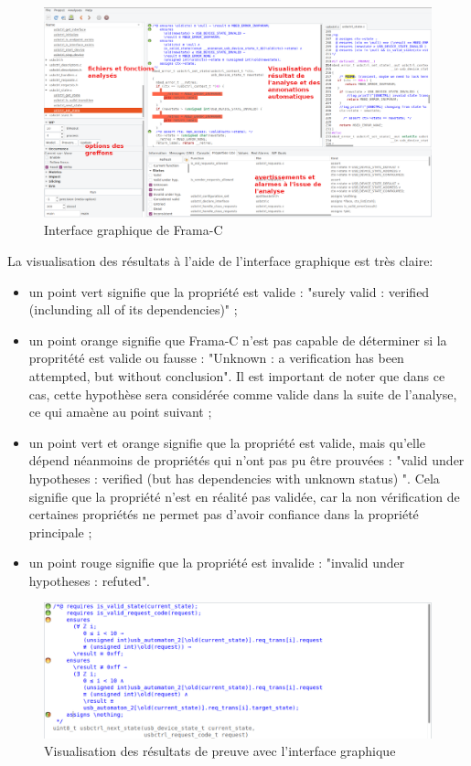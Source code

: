 \begin{figure}[!h]
\centering
\includegraphics[width=18cm]{images/interface_commentee_gimp.png}
\caption{Interface graphique de Frama-C}
\label{Interface graphique de Frama-C}
\end{figure}
\newpage
La visualisation des résultats à l'aide de l'interface graphique est très claire:
\begin{itemize}
	\item un point vert signifie que la propriété est valide : "surely valid : verified (inclunding all of its dependencies)" ;
	\item un point orange signifie que Frama-C n'est pas capable de déterminer si la propritété est valide ou fausse : "Unknown : a verification has been attempted, but without conclusion". Il est important de noter que dans ce cas, cette hypothèse sera considérée comme valide dans la suite de l'analyse, ce qui amaène au point suivant ;
	\item un point vert et orange signifie que la propriété est valide, mais qu'elle dépend néanmoins de propriétés qui n'ont pas pu être prouvées : "valid under hypotheses : verified (but has dependencies with unknown status) ". Cela signifie que la propriété n'est en réalité pas validée, car la non vérification de certaines propriétés ne permet pas d'avoir confiance dans la propriété principale ;
	\item un point rouge signifie que la propriété est invalide : "invalid under hypotheses : refuted".
\end{itemize}

\begin{figure}[!h]
\centering
\includegraphics[width=16cm]{images/interface_bullet.png}
\caption{Visualisation des résultats de preuve avec l'interface graphique}
\label{Visualisation des résultats de preuve avec l'interface graphique}
\end{figure}

